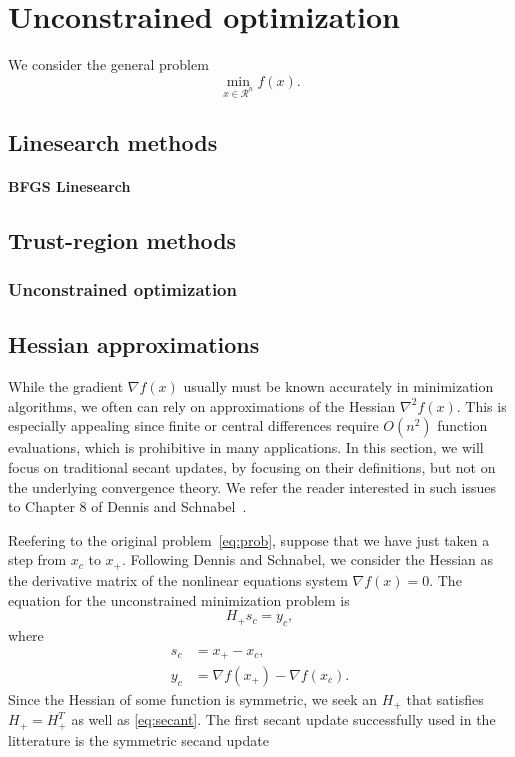 \chapter{Unconstrained optimization}

We consider the general problem
\begin{equation}
\min_{x \in \mathcal{R}^n} f(x).
\label{eq:prob}
\end{equation}

\section{Linesearch methods}

\subsubsection{BFGS Linesearch}

\section{Trust-region methods}

\subsection{Unconstrained optimization}

\section{Hessian approximations}

While the gradient $\nabla f(x)$ usually must be known accurately in
minimization algorithms, we often can rely on approximations of the
Hessian $\nabla^2 f(x)$.
This is especially appealing since finite or central differences
require $O(n^2)$ function evaluations, which is prohibitive in many
applications.
In this section, we will focus on traditional secant updates, by
focusing on their definitions, but not on the underlying convergence
theory.
We refer the reader interested in such issues to Chapter 8 of Dennis
and Schnabel~\cite{DennSchn83}.

Reefering to the original problem~\ref{eq:prob}, suppose that we have
just taken a step from $x_c$ to $x_+$.
Following Dennis and Schnabel, we consider the Hessian as the
derivative matrix of the nonlinear equations system $\nabla f(x) =
0$.
The  equation for the unconstrained minimization problem
is
\begin{equation}
H_+s_c = y_c,
\label{eq:secant}
\end{equation}
where
\begin{align*}
s_c &= x_+-x_c,\\
y_c &= \nabla f(x_+) - \nabla f(x_c).
\end{align*}
Since the Hessian of some function is symmetric, we seek an $H_+$ that
satisfies $H_+ = H_+^T$ as well as \eqref{eq:secant}.
The first secant update successfully used in the litterature is the
symmetric secand update

